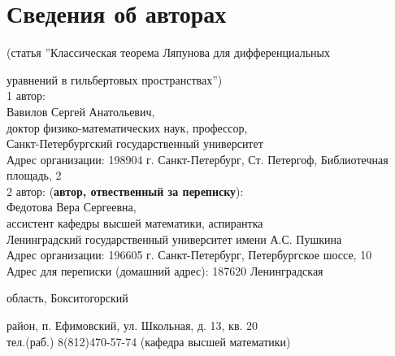 








\section*{Сведения об авторах}





(статья ''Классическая теорема Ляпунова для дифференциальных


уравнений в гильбертовых пространствах'')\\





1 автор:\\


Вавилов Сергей Анатольевич,\\


доктор физико-математических наук, профессор,\\


Санкт-Петербургский государственный университет\\


Адрес организации: 198904 г. Санкт-Петербург, Ст. Петергоф, Библиотечная площадь, 2\\








2 автор: (\textbf{автор, отвественный за переписку}):\\


Федотова Вера Сергеевна,\\


ассистент кафедры высшей математики, аспирантка\\


Ленинградский государственный университет имени А.С. Пушкина\\


Адрес организации: 196605 г. Санкт-Петербург, Петербургское шоссе, 10\\


Адрес для переписки (домашний адрес):  187620 Ленинградская


область, Бокситогорский


район, п. Ефимовский, ул. Школьная, д. 13, кв. 20\\


тел.(раб.) 8(812)470-57-74 (кафедра высшей математики)\\


